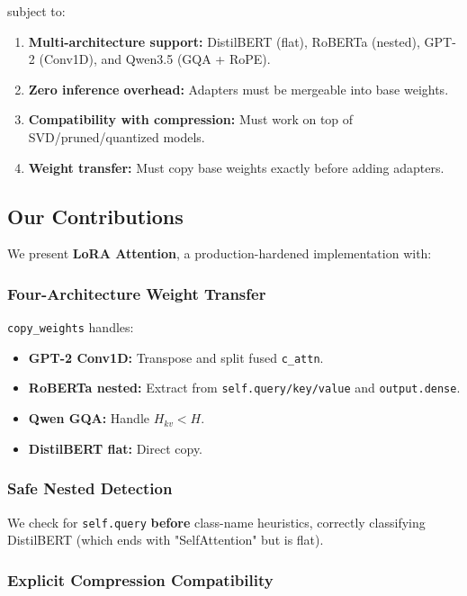 subject to:

\begin{enumerate}
\item \textbf{Multi-architecture support:} DistilBERT (flat), RoBERTa (nested),
  GPT-2 (Conv1D), and Qwen3.5 (GQA + RoPE).
\item \textbf{Zero inference overhead:} Adapters must be mergeable into base weights.
\item \textbf{Compatibility with compression:} Must work on top of SVD/pruned/quantized
  models.
\item \textbf{Weight transfer:} Must copy base weights exactly before adding adapters.

\end{enumerate}
\subsection{Our Contributions}

We present \textbf{LoRA Attention}, a production-hardened implementation with:

\subsubsection{Four-Architecture Weight Transfer}

\texttt{copy\_weights} handles:
\begin{itemize}
\item \textbf{GPT-2 Conv1D:} Transpose and split fused \texttt{c\_attn}.
\item \textbf{RoBERTa nested:} Extract from \texttt{self.query/key/value} and \texttt{output.dense}.
\item \textbf{Qwen GQA:} Handle $H_{kv} < H$.
\item \textbf{DistilBERT flat:} Direct copy.

\end{itemize}
\subsubsection{Safe Nested Detection}

We check for \texttt{self.query} \textbf{before} class-name heuristics, correctly 
classifying DistilBERT (which ends with "SelfAttention" but is flat).

\subsubsection{Explicit Compression Compatibility}


